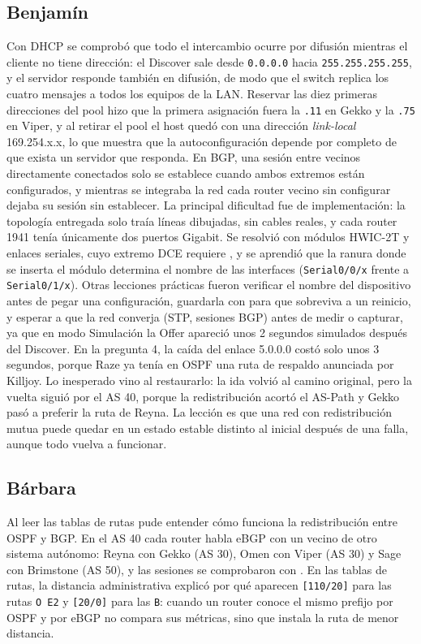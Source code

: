 \subsection*{Benjamín}
Con DHCP se comprobó que todo el intercambio ocurre por difusión mientras el cliente no tiene dirección: el Discover sale desde \texttt{0.0.0.0} hacia \texttt{255.255.255.255}, y el servidor responde también en difusión, de modo que el switch replica los cuatro mensajes a todos los equipos de la LAN. Reservar las diez primeras direcciones del pool hizo que la primera asignación fuera la \texttt{.11} en Gekko y la \texttt{.75} en Viper, y al retirar el pool el host quedó con una dirección \textit{link-local} 169.254.x.x, lo que muestra que la autoconfiguración depende por completo de que exista un servidor que responda. En BGP, una sesión entre vecinos directamente conectados solo se establece cuando ambos extremos están configurados, y mientras se integraba la red cada router vecino sin configurar dejaba su sesión sin establecer. La principal dificultad fue de implementación: la topología entregada solo traía líneas dibujadas, sin cables reales, y cada router 1941 tenía únicamente dos puertos Gigabit. Se resolvió con módulos HWIC-2T y enlaces seriales, cuyo extremo DCE requiere , y se aprendió que la ranura donde se inserta el módulo determina el nombre de las interfaces (\texttt{Serial0/0/x} frente a \texttt{Serial0/1/x}). Otras lecciones prácticas fueron verificar el nombre del dispositivo antes de pegar una configuración, guardarla con  para que sobreviva a un reinicio, y esperar a que la red converja (STP, sesiones BGP) antes de medir o capturar, ya que en modo Simulación la Offer apareció unos 2 segundos simulados después del Discover. En la pregunta 4, la caída del enlace 5.0.0.0 costó solo unos 3 segundos, porque Raze ya tenía en OSPF una ruta de respaldo anunciada por Killjoy. Lo inesperado vino al restaurarlo: la ida volvió al camino original, pero la vuelta siguió por el AS 40, porque la redistribución acortó el AS-Path y Gekko pasó a preferir la ruta de Reyna. La lección es que una red con redistribución mutua puede quedar en un estado estable distinto al inicial después de una falla, aunque todo vuelva a funcionar.

\subsection*{Bárbara}
Al leer las tablas de rutas pude entender cómo funciona la redistribución entre OSPF y BGP. En el AS 40 cada router habla eBGP con un vecino de otro sistema autónomo: Reyna con Gekko (AS 30), Omen con Viper (AS 30) y Sage con Brimstone (AS 50), y las sesiones se comprobaron con . En las tablas de rutas, la distancia administrativa explicó por qué aparecen \texttt{[110/20]} para las rutas \texttt{O E2} y \texttt{[20/0]} para las \texttt{B}: cuando un router conoce el mismo prefijo por OSPF y por eBGP no compara sus métricas, sino que instala la ruta de menor distancia.

